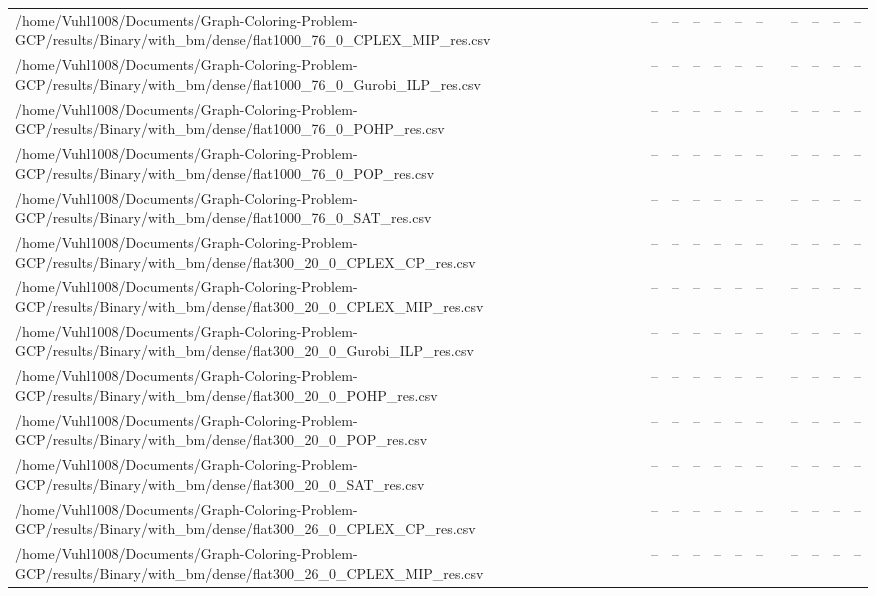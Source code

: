 \begin{table}[htbp]
\begin{tabular}{llllllllllll}
/home/Vuhl1008/Documents/Graph-Coloring-Problem-GCP/results/Binary/with\_bm/dense/flat1000\_76\_0\_CPLEX\_MIP\_res.csv & -- & -- & -- & -- & -- & -- & {} & -- & -- & -- & -- \\
/home/Vuhl1008/Documents/Graph-Coloring-Problem-GCP/results/Binary/with\_bm/dense/flat1000\_76\_0\_Gurobi\_ILP\_res.csv & -- & -- & -- & -- & -- & -- & {} & -- & -- & -- & -- \\
/home/Vuhl1008/Documents/Graph-Coloring-Problem-GCP/results/Binary/with\_bm/dense/flat1000\_76\_0\_POHP\_res.csv & -- & -- & -- & -- & -- & -- & {} & -- & -- & -- & -- \\
/home/Vuhl1008/Documents/Graph-Coloring-Problem-GCP/results/Binary/with\_bm/dense/flat1000\_76\_0\_POP\_res.csv & -- & -- & -- & -- & -- & -- & {} & -- & -- & -- & -- \\
/home/Vuhl1008/Documents/Graph-Coloring-Problem-GCP/results/Binary/with\_bm/dense/flat1000\_76\_0\_SAT\_res.csv & -- & -- & -- & -- & -- & -- & {} & -- & -- & -- & -- \\
/home/Vuhl1008/Documents/Graph-Coloring-Problem-GCP/results/Binary/with\_bm/dense/flat300\_20\_0\_CPLEX\_CP\_res.csv & -- & -- & -- & -- & -- & -- & {} & -- & -- & -- & -- \\
/home/Vuhl1008/Documents/Graph-Coloring-Problem-GCP/results/Binary/with\_bm/dense/flat300\_20\_0\_CPLEX\_MIP\_res.csv & -- & -- & -- & -- & -- & -- & {} & -- & -- & -- & -- \\
/home/Vuhl1008/Documents/Graph-Coloring-Problem-GCP/results/Binary/with\_bm/dense/flat300\_20\_0\_Gurobi\_ILP\_res.csv & -- & -- & -- & -- & -- & -- & {} & -- & -- & -- & -- \\
/home/Vuhl1008/Documents/Graph-Coloring-Problem-GCP/results/Binary/with\_bm/dense/flat300\_20\_0\_POHP\_res.csv & -- & -- & -- & -- & -- & -- & {} & -- & -- & -- & -- \\
/home/Vuhl1008/Documents/Graph-Coloring-Problem-GCP/results/Binary/with\_bm/dense/flat300\_20\_0\_POP\_res.csv & -- & -- & -- & -- & -- & -- & {} & -- & -- & -- & -- \\
/home/Vuhl1008/Documents/Graph-Coloring-Problem-GCP/results/Binary/with\_bm/dense/flat300\_20\_0\_SAT\_res.csv & -- & -- & -- & -- & -- & -- & {} & -- & -- & -- & -- \\
/home/Vuhl1008/Documents/Graph-Coloring-Problem-GCP/results/Binary/with\_bm/dense/flat300\_26\_0\_CPLEX\_CP\_res.csv & -- & -- & -- & -- & -- & -- & {} & -- & -- & -- & -- \\
/home/Vuhl1008/Documents/Graph-Coloring-Problem-GCP/results/Binary/with\_bm/dense/flat300\_26\_0\_CPLEX\_MIP\_res.csv & -- & -- & -- & -- & -- & -- & {} & -- & -- & -- & -- \\

\end{tabular}
\end{table}
